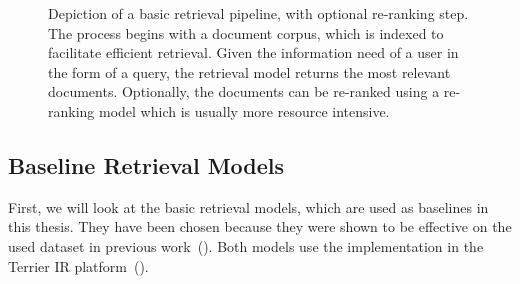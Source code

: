 \begin{figure}[tb]
\centering
{}
\caption{Depiction of a basic retrieval pipeline, with optional re-ranking step. The process begins with a document corpus, which is indexed to facilitate efficient retrieval. Given the information need of a user in the form of a query, the retrieval model returns the most relevant documents. Optionally, the documents can be re-ranked using a re-ranking model which is usually more resource intensive.}
\label{fig:reranking_pipeline}
\end{figure}

\subsection{Baseline Retrieval Models}\label{sec:baseline-retrieval-models}
First, we will look at the basic retrieval models, which are used as baselines in this thesis.
They have been chosen because they were shown to be effective on the used dataset in previous work~(\cite{goeuriot:2021:Consumer}).
Both models use the implementation in the Terrier IR platform~(\cite{ounis:2005:Terrier}).

